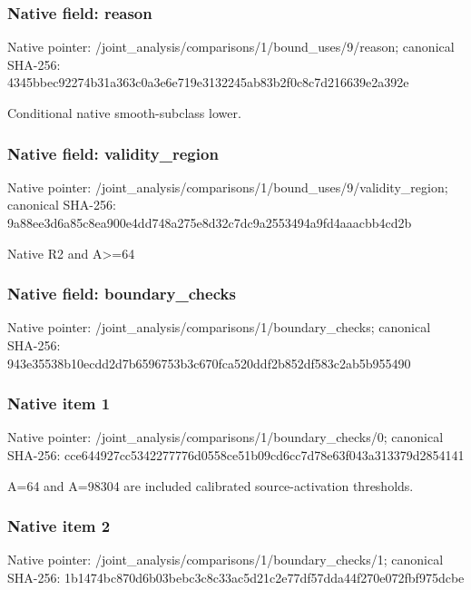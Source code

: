 \documentclass[10pt,a4paper]{article}
\begin{document}
\subsubsection{Native field: reason}
Native pointer: /joint\_\allowbreak{}analysis/comparisons/1/bound\_\allowbreak{}uses/9/reason; canonical SHA-256: 4345bbec92274b31a363c0a3e6e719e3132245ab83b2f0c8c7d216639e2a392e

\begingroup\raggedright\sloppy Conditional native smooth-subclass lower.\par\endgroup

\subsubsection{Native field: validity\_\allowbreak{}region}
Native pointer: /joint\_\allowbreak{}analysis/comparisons/1/bound\_\allowbreak{}uses/9/validity\_\allowbreak{}region; canonical SHA-256: 9a88ee3d6a85c8ea900e4dd748a275e8d32c7dc9a2553494a9fd4aaacbb4cd2b

\begingroup\raggedright\sloppy Native R2 and A>=\allowbreak{}64\par\endgroup

\subsubsection{Native field: boundary\_\allowbreak{}checks}
Native pointer: /joint\_\allowbreak{}analysis/comparisons/1/boundary\_\allowbreak{}checks; canonical SHA-256: 943e35538b10ecdd2d7b6596753b3c670fca520ddf2b852df583c2ab5b955490

\subsubsection{Native item 1}
Native pointer: /joint\_\allowbreak{}analysis/comparisons/1/boundary\_\allowbreak{}checks/0; canonical SHA-256: cce644927cc5342277776d0558ce51b09cd6cc7d78e63f043a313379d2854141

\begingroup\raggedright\sloppy A=\allowbreak{}64 and A=\allowbreak{}98304 are included calibrated source-activation thresholds.\par\endgroup

\subsubsection{Native item 2}
Native pointer: /joint\_\allowbreak{}analysis/comparisons/1/boundary\_\allowbreak{}checks/1; canonical SHA-256: 1b1474bc870d6b03bebc3c8c33ac5d21c2e77df57dda44f270e072fbf975dcbe
\end{document}
